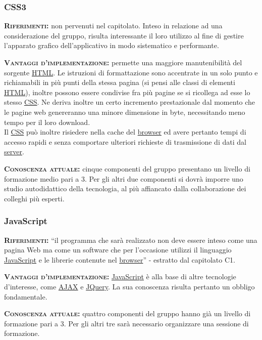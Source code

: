 \subsubsection{CSS3}
\begin{description}
	\item{\scshape\bfseries Riferimenti:} non pervenuti nel capitolato. Inteso in relazione ad una considerazione del gruppo, risulta interessante il loro utilizzo al fine di gestire l'apparato grafico dell'applicativo in modo sistematico e performante.
	
\item{\scshape\bfseries Vantaggi d'implementazione:} permette una maggiore manutenibilità del sorgente \underline{HTML}. Le istruzioni di formattazione sono accentrate in un solo punto e richiamabili in più punti della stessa pagina (si pensi alle classi di elementi \underline{HTML}), inoltre possono essere condivise fra più pagine se si ricollega ad esse lo stesso \underline{CSS}\@. Ne deriva inoltre un certo incremento prestazionale dal momento che le pagine web genereranno una minore dimensione in byte, necessitando meno tempo per il loro download. \\Il \underline{CSS} può inoltre risiedere nella cache del \underline{browser} ed avere pertanto tempi di accesso rapidi e senza comportare ulteriori richieste di trasmissione di dati dal \underline{server}.
	
	\item{\scshape\bfseries Conoscenza attuale:} cinque componenti del gruppo presentano un livello di formazione medio pari a 3. Per gli altri due componenti si dovrà imporre uno studio autodidattico della tecnologia, al più affiancato dalla collaborazione dei colleghi più esperti.
\end{description}

\subsubsection{JavaScript}
\begin{description} 
	\item{\scshape\bfseries Riferimenti:}
  ``il programma che sarà realizzato non deve essere inteso come una pagina Web ma come un software che per l'occasione utilizzi il linguaggio \underline{JavaScript} e le librerie contenute nel \underline{browser}'' - estratto dal capitolato C1.

	\item{\scshape\bfseries Vantaggi d'implementazione:} \underline{JavaScript} è alla base di altre tecnologie d'interesse, come \underline{AJAX} e \underline{JQuery}. La sua conoscenza risulta pertanto un obbligo fondamentale.

	\item{\scshape\bfseries Conoscenza attuale:} quattro componenti del gruppo hanno già un livello di formazione pari a 3. Per gli altri tre sarà necessario organizzare una sessione di formazione.
\end{description}


